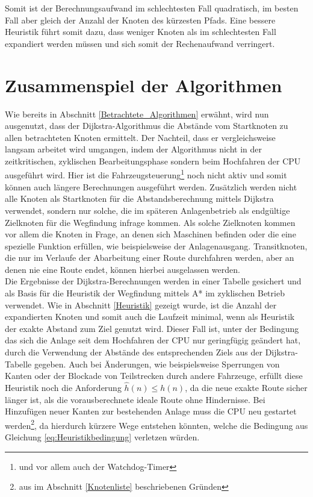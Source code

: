 		Somit ist der Berechnungsaufwand im schlechtesten Fall quadratisch, im besten Fall aber gleich der Anzahl der Knoten des kürzesten Pfads. Eine bessere Heuristik führt somit dazu, dass weniger Knoten als im schlechtesten Fall expandiert werden müssen und sich somit der Rechenaufwand verringert.
		
	\section{Zusammenspiel der Algorithmen}
		\label{Verwendung_Alg}
		Wie bereits in Abschnitt \ref{Betrachtete_Algorithmen} erwähnt, wird nun ausgenutzt, dass der Dijkstra-Algorithmus die Abstände vom Startknoten zu allen betrachteten Knoten ermittelt.  Der Nachteil, dass er vergleichsweise langsam arbeitet wird umgangen, indem der Algorithmus nicht in der zeitkritischen, zyklischen Bearbeitungsphase sondern beim Hochfahren der CPU ausgeführt wird. Hier ist die Fahrzeugsteuerung\footnote{und vor allem auch der Watchdog-Timer} noch nicht aktiv und somit können auch längere Berechnungen ausgeführt werden. Zusätzlich werden nicht alle Knoten als Startknoten für die Abstandsberechnung mittels Dijkstra verwendet, sondern nur solche, die im späteren Anlagenbetrieb als endgültige Zielknoten für die Wegfindung infrage kommen. Als solche Zielknoten kommen vor allem die Knoten in Frage, an denen sich Maschinen befinden oder die eine spezielle Funktion erfüllen, wie beispielsweise der Anlagenausgang. Transitknoten, die nur im Verlaufe der Abarbeitung einer Route durchfahren werden, aber an denen nie eine Route endet, können hierbei ausgelassen werden.
		\\[4pt]
		Die Ergebnisse der Dijkstra-Berechnungen werden in einer Tabelle gesichert und als Basis für die Heuristik der Wegfindung mittels A* im zyklischen Betrieb verwendet. Wie in  Abschnitt \ref{Heuristik} gezeigt wurde, ist die Anzahl der expandierten Knoten und somit auch die Laufzeit minimal, wenn als Heuristik der exakte Abstand zum Ziel genutzt wird. Dieser Fall ist, unter der Bedingung das sich die Anlage seit dem Hochfahren der CPU nur geringfügig geändert hat, durch die Verwendung der Abstände des entsprechenden Ziels aus der Dijkstra-Tabelle gegeben. Auch bei Änderungen, wie beispielsweise Sperrungen von Kanten oder der Blockade von Teilstrecken durch andere Fahrzeuge, erfüllt diese Heuristik noch die Anforderung $\hat{h}(n)\le h(n)$, da die neue exakte Route sicher länger ist, als die vorausberechnete ideale Route ohne Hindernisse. Bei Hinzufügen neuer Kanten zur bestehenden Anlage muss die CPU neu gestartet werden\footnote{aus im Abschnitt \ref{Knotenliste} beschriebenen Gründen}, da hierdurch kürzere Wege entstehen könnten, welche die Bedingung aus Gleichung \ref{eq:Heuristikbedingung} verletzen würden.
		
		
				





